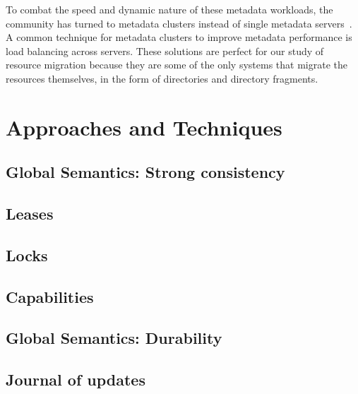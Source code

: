 
To combat the speed and dynamic nature of these metadata workloads, the
community has turned to metadata clusters instead of single metadata
servers~\cite{patil:fast2011-giga+,weil:osdi2006-ceph,weil:sc2004-dyn-metadata,sinnamohideen:atc2010-ursa,xing:sc2009-skyfs}.
A common technique for metadata clusters to improve metadata performance is
load balancing across servers. These solutions are perfect for our study of
resource migration because they are some of the only systems that migrate the
resources themselves, in the form of directories and directory fragments. 






\section{Approaches and Techniques}

\subsection{Global Semantics: Strong consistency}
\subsection{Leases}
\subsection{Locks}
\subsection{Capabilities}

\subsection{Global Semantics: Durability}
\subsection{Journal of updates}

